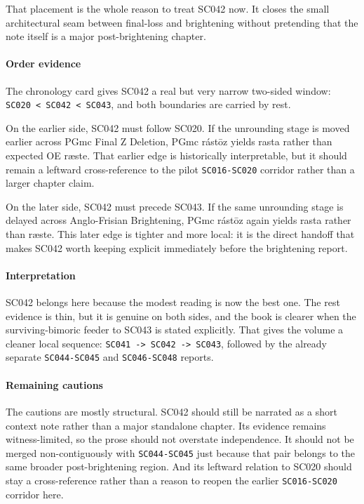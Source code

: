 \documentclass[
  british,
  a4paper,
]{article}
\begin{document}
That placement is the whole reason to treat SC042 now. It closes the
small architectural seam between final-loss and brightening without
pretending that the note itself is a major post-brightening chapter.

\paragraph{Order evidence}\label{order-evidence-26}

The chronology card gives SC042 a real but very narrow two-sided window:
\texttt{SC020\ \textless{}\ SC042\ \textless{}\ SC043}, and both
boundaries are carried by rest.

On the earlier side, SC042 must follow SC020. If the unrounding stage is
moved earlier across PGmc Final Z Deletion, PGmc rástōz yields rasta
rather than expected OE ræste. That earlier edge is historically
interpretable, but it should remain a leftward cross-reference to the
pilot \texttt{SC016-SC020} corridor rather than a larger chapter claim.

On the later side, SC042 must precede SC043. If the same unrounding
stage is delayed across Anglo-Frisian Brightening, PGmc rástōz again
yields rasta rather than ræste. This later edge is tighter and more
local: it is the direct handoff that makes SC042 worth keeping explicit
immediately before the brightening report.

\paragraph{Interpretation}\label{interpretation-26}

SC042 belongs here because the modest reading is now the best one. The
rest evidence is thin, but it is genuine on both sides, and the book is
clearer when the surviving-bimoric feeder to SC043 is stated explicitly.
That gives the volume a cleaner local sequence:
\texttt{SC041\ -\textgreater{}\ SC042\ -\textgreater{}\ SC043}, followed
by the already separate \texttt{SC044-SC045} and \texttt{SC046-SC048}
reports.

\paragraph{Remaining cautions}\label{remaining-cautions-26}

The cautions are mostly structural. SC042 should still be narrated as a
short context note rather than a major standalone chapter. Its evidence
remains witness-limited, so the prose should not overstate independence.
It should not be merged non-contiguously with \texttt{SC044-SC045} just
because that pair belongs to the same broader post-brightening region.
And its leftward relation to SC020 should stay a cross-reference rather
than a reason to reopen the earlier \texttt{SC016-SC020} corridor here.
\end{document}
